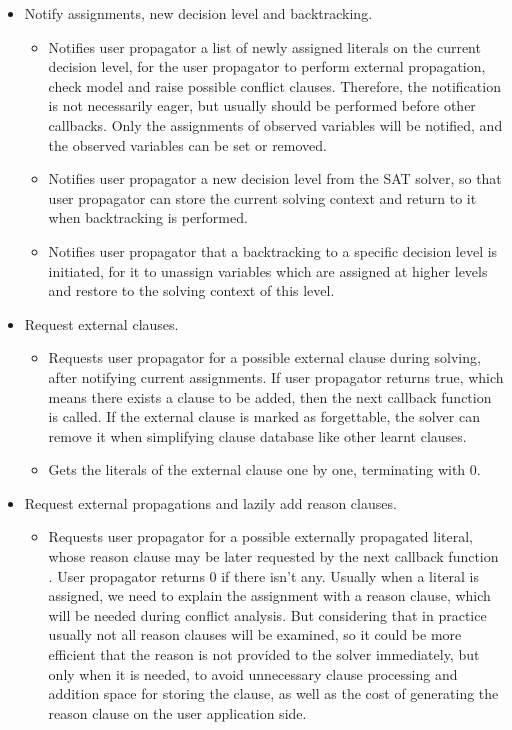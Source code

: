 \begin{itemize}
  \item Notify assignments, new decision level and backtracking.
    \begin{itemize}
      \item {} Notifies user propagator a list of newly assigned literals on the current decision level, for the user propagator to perform external propagation, check model and raise possible conflict clauses. Therefore, the notification is not necessarily eager, but usually should be performed before other callbacks. Only the assignments of observed variables will be notified, and the observed variables can be set or removed.
      \item {} Notifies user propagator a new decision level from the SAT solver, so that user propagator can store the current solving context and return to it when backtracking is performed.
      \item {} Notifies user propagator that a backtracking to a specific decision level is initiated, for it to unassign variables which are assigned at higher levels and restore to the solving context of this level.
    \end{itemize}
  \item Request external clauses.
    \begin{itemize}
      \item {} Requests user propagator for a possible external clause during solving, after notifying current assignments. If user propagator returns true, which means there exists a clause to be added, then the next callback function  is called. If the external clause is marked as forgettable, the solver can remove it when simplifying clause database like other learnt clauses.
      \item {} Gets the literals of the external clause one by one, terminating with 0.  
    \end{itemize}
  \item Request external propagations and lazily add reason clauses.
    \begin{itemize}
      \item {} Requests user propagator for a possible externally propagated literal, whose reason clause may be later requested by the next callback function . User propagator returns 0 if there isn't any. Usually when a literal is assigned, we need to explain the assignment with a reason clause, which will be needed during conflict analysis. But considering that in practice usually not all reason clauses will be examined, so it could be more efficient that the reason is not provided to the solver immediately, but only when it is needed, to avoid unnecessary clause processing and addition space for storing the clause, as well as the cost of generating the reason clause on the user application side.

\end{itemize}
\end{itemize}
